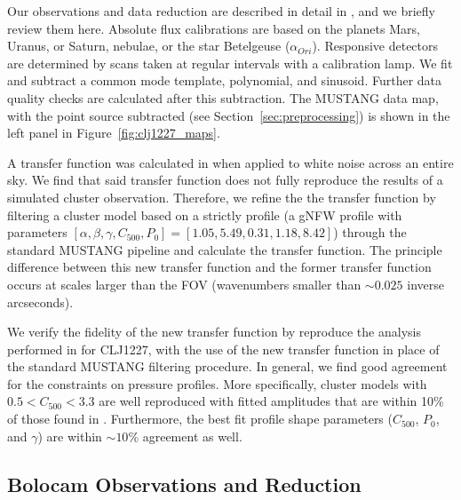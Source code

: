 \documentclass[iop,numberedappendix,apj]{emulateapj}
\begin{document}
Our observations and data reduction are described in detail in \citet{romero2015a}, and we briefly review them
here. Absolute flux calibrations are based on the planets Mars, Uranus, or Saturn, nebulae, or the star Betelgeuse 
($\alpha_{Ori}$). Responsive detectors are determined by scans taken at regular intervals with a calibration lamp.
We fit and subtract a common mode template, polynomial, and sinusoid. Further data quality checks are calculated
after this subtraction. The MUSTANG data map, with the point source subtracted (see Section~\ref{sec:preprocessing})
is shown in the left panel in Figure~\ref{fig:clj1227_maps}.


A transfer function was calculated in \citet{romero2016} when applied to white noise
across an entire sky. We find that said transfer function does not fully reproduce the results of a simulated
cluster observation. Therefore, we refine the the transfer function by filtering a cluster model based on a strictly
 profile (a gNFW profile with parameters
$[\alpha,\beta,\gamma,C_{500},P_0]=[1.05,5.49,0.31,1.18,8.42]$) through the standard MUSTANG pipeline and calculate
the transfer function. The principle difference between this new transfer function and the former transfer function
occurs at scales larger than the FOV (wavenumbers smaller than $\sim0.025$ inverse arcseconds).

We verify the fidelity of the new transfer function by reproduce the analysis performed in \citet{romero2016} for CLJ1227,
with the use of the new transfer function in place of the standard MUSTANG filtering procedure.
In general, we find good agreement for the constraints on pressure profiles. More specifically, cluster models with
$0.5 < C_{500} < 3.3$ are well reproduced with fitted amplitudes that are within 10\% of those found in \citet{romero2016}.
Furthermore, the best fit profile shape parameters ($C_{500}$, $P_0$, and $\gamma$) are within $\sim10$\% agreement as well.



\subsection{Bolocam Observations and Reduction}
\label{sec:bolocamobs}
\end{document}
